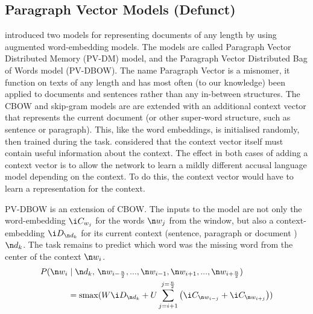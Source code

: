 {\subsection{Paragraph Vector Models (Defunct)}




 introduced two models for representing documents of any length by using augmented word-embedding models.
The models are called Paragraph Vector Distributed Memory (PV-DM) model,
and the Paragraph Vector Distributed Bag of Words  model (PV-DBOW).
The name Paragraph Vector is a misnomer, it function on texts of any length and has most often (to our knowledge) been applied to documents and sentences rather than any in-between structures.
The CBOW and skip-gram models are are extended with an additional context vector that represents the current document (or other super-word structure, such as sentence or paragraph).
This, like the word embeddings, is initialised randomly, then trained during the task.
\textcite{le2014distributed} considered that the context vector itself must contain useful information about the context.
The effect in both cases of adding a context vector is to allow the network to learn a mildly different accusal language model depending on the context.
To do this, the context vector would have to learn a representation for the context.



PV-DBOW is an extension of CBOW.
The inputs to the model are not only the word-embedding $\i C_{w_j}$ for the words $\n w_j$ from the window,
but also a context-embedding $\i D_{\n d_k}$ for its current context (sentence, paragraph or document ) $\n d_k$.
The task remains to predict which word was the missing word from the center of the context $\n w_i$.
\begin{align}
P(\n w_i & \mid \n d_k,\, \n w_{i-\frac{n}{2}},..., \n w_{i-1}, \n w_{i+1},...,\n w_{i+\frac{n}{2}})  \nonumber
\\  & = \softmax(W\i D_{\n d_k} + U \sum_{j=i+1}^{j=\frac{n}{2}} \left( \i C_{\n w_{i-j}}+\i C_{\n w_{i+j}} \right))
\end{align}


}
